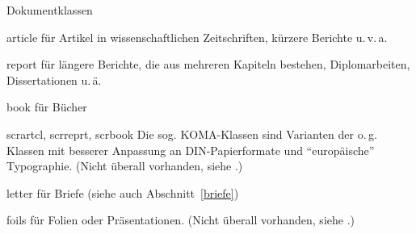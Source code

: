 \begin{table}[hbpt]
\caption{Dokumentklassen} \label{docstyles}
\begin{lminipage}{11cm}
\begin{ttdescription}%
\item [article] für Artikel in wissenschaftlichen Zeitschriften,
  kürzere Berichte u.\,v.\,a.
 
\item [report] für längere Berichte, die aus mehreren Kapiteln
  bestehen, Diplomarbeiten, Dissertationen u.\,ä.
 
\item [book] für Bücher

\item[scrartcl, scrreprt, scrbook]\quad Die sog. KOMA-Klassen 
sind Varianten der o.\,g. Klassen
mit besserer Anpassung an DIN-Papierformate und "`europäische"'
Typographie. 
(Nicht überall vorhanden, siehe \local.)


\item [letter] für Briefe (siehe auch Abschnitt~\ref{briefe})

\item [foils] für Folien oder Präsentationen.
(Nicht überall vorhanden, siehe \local.)
  
\end{ttdescription}
\end{lminipage}
\end{table}

